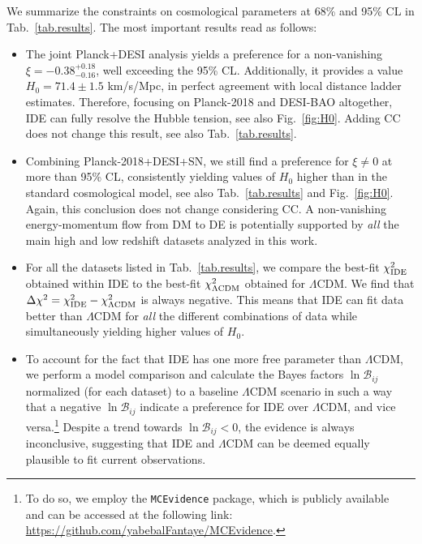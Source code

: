 \documentclass[superscriptaddress,twocolumn,showpacs,a4paper,
amssymb,amsmath,nobibnotes,aps,prl,
showkeys,
nofootinbib,notitlepage]{revtex4-1}
\begin{document}
We summarize the constraints on cosmological parameters at 68\% and 95\% CL in Tab.~\ref{tab.results}. The most important results read as follows:
\begin{itemize}[leftmargin=*]

\item The joint Planck+DESI analysis yields a preference for a non-vanishing $\xi = -0.38^{+0.18}_{-0.16}$, well exceeding the 95\% CL. Additionally, it provides a value $H_0 = 71.4 \pm 1.5$ km/s/Mpc, in perfect agreement with local distance ladder estimates. Therefore, focusing on Planck-2018 and DESI-BAO altogether, IDE can fully resolve the Hubble tension, see also Fig.~\ref{fig:H0}. Adding CC does not change this result, see also Tab.~\ref{tab.results}.

\item Combining Planck-2018+DESI+SN, we still find a preference for $\xi \neq 0$ at more than 95\% CL, consistently yielding values of $H_0$ higher than in the standard cosmological model, see also Tab.~\ref{tab.results} and Fig.~\ref{fig:H0}. Again, this conclusion does not change considering CC. A non-vanishing energy-momentum flow from DM to DE is potentially supported by \textit{all} the main high and low redshift datasets analyzed in this work.

\item For all the datasets listed in Tab.~\ref{tab.results}, we compare the best-fit $\chi^2_{\rm{IDE}}$ obtained within IDE to the best-fit $\chi^2_{\Lambda\rm{CDM}}$ obtained for $\Lambda$CDM. We find that $\Delta \chi^2 = \chi^2_{\rm{IDE}} - \chi^2_{\Lambda\rm{CDM}}$ is always negative. This means that IDE can fit data better than $\Lambda$CDM for \textit{all} the different combinations of data while simultaneously yielding higher values of $H_0$.

\item To account for the fact that IDE has one more free parameter than $\Lambda$CDM, we perform a model comparison and calculate the Bayes factors $\ln \mathcal B_{ij}$ normalized (for each dataset) to a baseline $\Lambda$CDM scenario in such a way that a negative $\ln \mathcal B_{ij}$ indicate a preference for IDE over $\Lambda$CDM, and vice versa.\footnote{To do so, we employ the \texttt{MCEvidence} package, which is publicly available~\cite{Heavens:2017hkr,Heavens:2017afc} and can be accessed at the following link: \url{https://github.com/yabebalFantaye/MCEvidence}.} Despite a trend towards $\ln \mathcal B_{ij} < 0$, the evidence is always inconclusive, suggesting that IDE and $\Lambda$CDM can be deemed equally plausible to fit current observations. 

\end{itemize}
\end{document}
